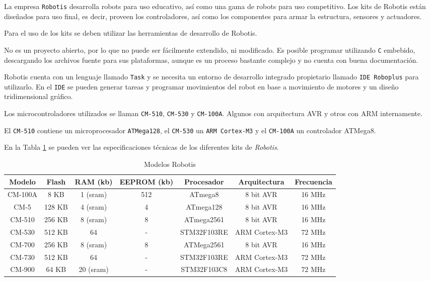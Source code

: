
  La empresa \texttt{Robotis} desarrolla robots para uso
educativo, así como una gama de robots para uso competitivo.
  Los kits de Robotis están diseñados para uso final, es decir,
proveen los controladores, así como los componentes para armar
la estructura, sensores y actuadores.

  Para el uso de los kits se deben utilizar las herramientas de desarrollo
de Robotis.

  No es un proyecto abierto, por lo que no puede ser fácilmente
extendido, ni modificado.
  Es posible programar utilizando \texttt{C} embebido, descargando
los archivos fuente para sus plataformas, aunque es un proceso
bastante complejo y no cuenta con buena documentación.

  Robotis cuenta con un lenguaje llamado \texttt{Task} y se necesita
  un entorno de desarrollo integrado propietario llamado 
  \texttt{IDE Roboplus} para utilizarlo.
  En el \texttt{IDE} se pueden generar tareas y programar
  movimientos del robot en base a movimiento de motores y un
  diseño tridimensional gráfico.

  Los microcontroladores utilizados se llaman \texttt{CM-510},
  \texttt{CM-530} y \texttt{CM-100A}. Algunos con
  arquitectura AVR y otros con ARM internamente.

  El \texttt{CM-510} contiene un microprocesador \texttt{ATMega128},
  el \texttt{CM-530} un \texttt{ARM Cortex-M3} y el
  \texttt{CM-100A} un controlador {ATMega8}.

  En la Tabla \ref{table-robotis} se pueden ver las especificaciones
  técnicas de los diferentes kits de \textit{Robotis}.

\begin{table}[htbp]
    \centering
    \scriptsize
    \caption{Modelos Robotis}
    \label{table-robotis}
  \begin{tabular}{|c|c|c|c|c|c|c|}
    \hline
      Modelo & Flash & RAM (kb) & EEPROM (kb) & Procesador & Arquitectura & Frecuencia \\
    \hline
      CM-100A & 8 KB & 1 (sram) & 512 & ATmega8 & 8 bit AVR & 16 MHz \\
    \hline
      CM-5 & 128 KB & 4 (sram) & 4 & ATmega128 & 8 bit AVR & 16 MHz \\
    \hline
      CM-510 & 256 KB & 8 (sram) & 8 & ATmega2561 & 8 bit AVR & 16 MHz \\
    \hline
      CM-530 & 512 KB & 64 & - & STM32F103RE & ARM Cortex-M3 & 72 MHz \\
    \hline
      CM-700 & 256 KB & 8 (sram) & 8 & ATMega2561 & 8 bit AVR & 16 MHz \\
    \hline
      CM-730 & 512 KB & 64 & - & STM32F103RE & ARM Cortex-M3 & 72 MHz \\
    \hline
      CM-900 & 64 KB & 20 (sram) & - & STM32F103C8 & ARM Cortex-M3 & 72 MHz \\
    \hline
    \end{tabular}
  \end{table}

